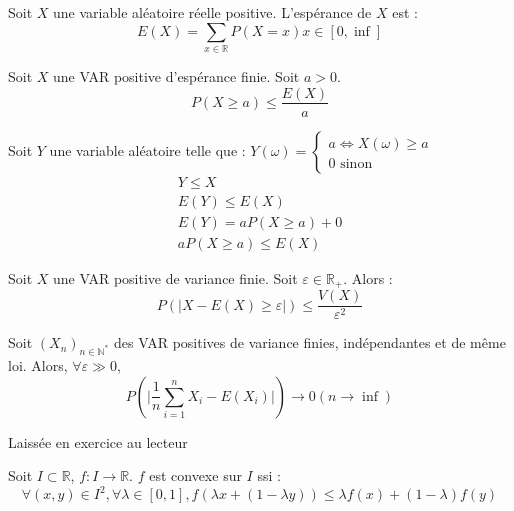 \begin{definition}[Espérance]
    Soit \(X\) une variable aléatoire réelle positive. L'espérance de \(X\) est : 
    \[
        E(X) = \sum_{x \in \mathbb{R}} P(X=x)x \in [0, \inf ]
    \] 
\end{definition}
\begin{lemma}
    Soit \(X\) une VAR positive d'espérance finie. Soit \(a>0\). 
    \[
        P(X\geq a) \leq \frac{E(X)}{a}
    \]
\end{lemma}

\begin{explanation}
    Soit \(Y\) une variable aléatoire telle que : \(Y(\omega ) = \begin{cases}
        a \iff X(\omega )\geq a\\
        0 \text{ sinon}
    \end{cases}\)
    \begin{eqnarray*}
        Y\leq X \\
        E(Y) \leq E(X) \\
        E(Y) = aP(X\geq a) + 0\\
        aP(X \geq a) \leq E(X)
    \end{eqnarray*}
     
\end{explanation}

\begin{lemma}
    Soit \(X\) une VAR positive de variance finie. Soit \(\varepsilon \in  \mathbb{R}_{+}\). Alors : 
    \[
        P(\lvert X-E(X) \geq \varepsilon \rvert ) \leq \frac{V(X)}{\varepsilon^{2}}
    \] 
\end{lemma}

\begin{lemma}
    Soit \((X_{n})_{n \in \mathbb{N}^{*}}\) des VAR positives de variance finies, indépendantes et de même loi. Alors, \(\forall \varepsilon \gg 0\), 
    \[
        P(\lvert \frac{1}{n} \sum_{i=1}^{n} X_{i} - E(X_{i}) \rvert ) \to  0 (n \to  \inf )
    \] 
\end{lemma}

\begin{explanation}
    Laissée en exercice au lecteur
\end{explanation}

\begin{definition}[Convexité]
    Soit \(I \subset \mathbb{R}\), \(f : I \to \mathbb{R}\). \(f\) est convexe sur \(I\) ssi : 
    \[
        \forall (x,y) \in I^{2}, \forall \lambda \in [0,1], f(\lambda x + (1-\lambda y)) \leq \lambda f(x) + (1-\lambda )f(y)
    \]  
\end{definition}

